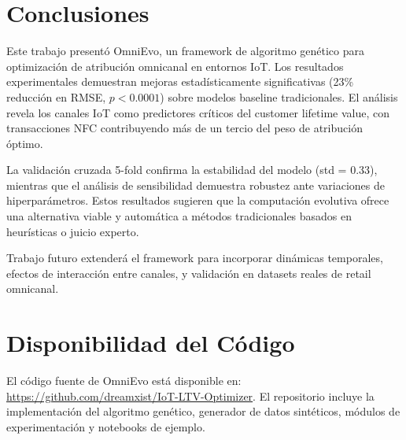 \documentclass[conference]{IEEEtran}
\begin{document}
\section{Conclusiones}
Este trabajo presentó OmniEvo, un framework de algoritmo genético para optimización de atribución omnicanal en entornos IoT. Los resultados experimentales demuestran mejoras estadísticamente significativas (23\% reducción en RMSE, $p < 0.0001$) sobre modelos baseline tradicionales. El análisis revela los canales IoT como predictores críticos del customer lifetime value, con transacciones NFC contribuyendo más de un tercio del peso de atribución óptimo.

La validación cruzada 5-fold confirma la estabilidad del modelo (std = 0.33), mientras que el análisis de sensibilidad demuestra robustez ante variaciones de hiperparámetros. Estos resultados sugieren que la computación evolutiva ofrece una alternativa viable y automática a métodos tradicionales basados en heurísticas o juicio experto.

Trabajo futuro extenderá el framework para incorporar dinámicas temporales, efectos de interacción entre canales, y validación en datasets reales de retail omnicanal.

\section*{Disponibilidad del Código}
El código fuente de OmniEvo está disponible en: \url{https://github.com/dreamxist/IoT-LTV-Optimizer}. El repositorio incluye la implementación del algoritmo genético, generador de datos sintéticos, módulos de experimentación y notebooks de ejemplo.
\end{document}
